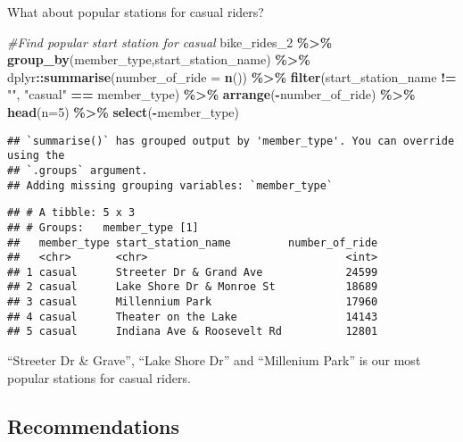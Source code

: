 \documentclass[
]{article}
\newenvironment{Shaded}{\begin{snugshade}}{\end{snugshade}}
\newcommand{\AttributeTok}[1]{\textcolor[rgb]{0.13,0.29,0.53}{#1}}
\newcommand{\CommentTok}[1]{\textcolor[rgb]{0.56,0.35,0.01}{\textit{#1}}}
\newcommand{\DecValTok}[1]{\textcolor[rgb]{0.00,0.00,0.81}{#1}}
\newcommand{\FunctionTok}[1]{\textcolor[rgb]{0.13,0.29,0.53}{\textbf{#1}}}
\newcommand{\NormalTok}[1]{#1}
\newcommand{\SpecialCharTok}[1]{\textcolor[rgb]{0.81,0.36,0.00}{\textbf{#1}}}
\newcommand{\StringTok}[1]{\textcolor[rgb]{0.31,0.60,0.02}{#1}}
\begin{document}
What about popular stations for casual riders?

\begin{Shaded}
\begin{Highlighting}[]
\CommentTok{\#Find popular start station for casual}
\NormalTok{bike\_rides\_2 }\SpecialCharTok{\%\textgreater{}\%}
  \FunctionTok{group\_by}\NormalTok{(member\_type,start\_station\_name) }\SpecialCharTok{\%\textgreater{}\%}
\NormalTok{  dplyr}\SpecialCharTok{::}\FunctionTok{summarise}\NormalTok{(}\AttributeTok{number\_of\_ride =} \FunctionTok{n}\NormalTok{()) }\SpecialCharTok{\%\textgreater{}\%}
  \FunctionTok{filter}\NormalTok{(start\_station\_name }\SpecialCharTok{!=} \StringTok{""}\NormalTok{, }\StringTok{"casual"} \SpecialCharTok{==}\NormalTok{ member\_type) }\SpecialCharTok{\%\textgreater{}\%}
  \FunctionTok{arrange}\NormalTok{(}\SpecialCharTok{{-}}\NormalTok{number\_of\_ride) }\SpecialCharTok{\%\textgreater{}\%}
  \FunctionTok{head}\NormalTok{(}\AttributeTok{n=}\DecValTok{5}\NormalTok{) }\SpecialCharTok{\%\textgreater{}\%}
  \FunctionTok{select}\NormalTok{(}\SpecialCharTok{{-}}\NormalTok{member\_type)}
\end{Highlighting}
\end{Shaded}

\begin{verbatim}
## `summarise()` has grouped output by 'member_type'. You can override using the
## `.groups` argument.
## Adding missing grouping variables: `member_type`
\end{verbatim}

\begin{verbatim}
## # A tibble: 5 x 3
## # Groups:   member_type [1]
##   member_type start_station_name         number_of_ride
##   <chr>       <chr>                               <int>
## 1 casual      Streeter Dr & Grand Ave             24599
## 2 casual      Lake Shore Dr & Monroe St           18689
## 3 casual      Millennium Park                     17960
## 4 casual      Theater on the Lake                 14143
## 5 casual      Indiana Ave & Roosevelt Rd          12801
\end{verbatim}

``Streeter Dr \& Grave'', ``Lake Shore Dr'' and ``Millenium Park'' is
our most popular stations for casual riders.

\hypertarget{recommendations}{%
\subsection{Recommendations}\label{recommendations}}
\end{document}
